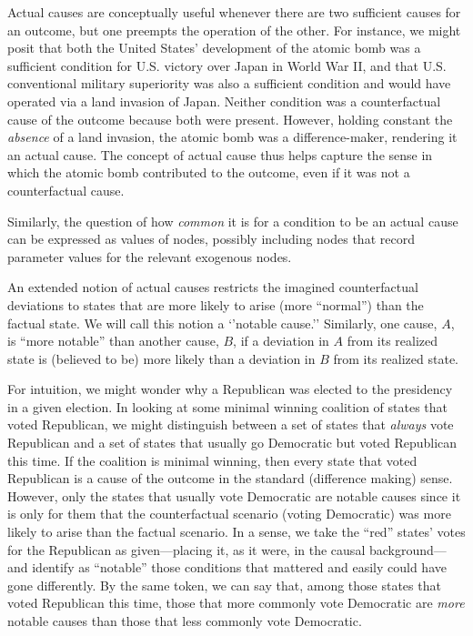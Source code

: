 \documentclass[12pt,]{book}
\begin{document}
Actual causes are conceptually useful whenever there are two sufficient causes for an outcome, but one preempts the operation of the other. For instance, we might posit that both the United States' development of the atomic bomb was a sufficient condition for U.S. victory over Japan in World War II, and that U.S. conventional military superiority was also a sufficient condition and would have operated via a land invasion of Japan. Neither condition was a counterfactual cause of the outcome because both were present. However, holding constant the \emph{absence} of a land invasion, the atomic bomb was a difference-maker, rendering it an actual cause. The concept of actual cause thus helps capture the sense in which the atomic bomb contributed to the outcome, even if it was not a counterfactual cause.

Similarly, the question of how \emph{common} it is for a condition to be an actual cause can be expressed as values of nodes, possibly including nodes that record parameter values for the relevant exogenous nodes.

An extended notion \citep[p 81]{halpern2016actual} of actual causes restricts the imagined counterfactual deviations to states that are more likely to arise (more ``normal'') than the factual state. We will call this notion a `'notable cause.'' Similarly, one cause, \(A\), is ``more notable'' than another cause, \(B\), if a deviation in \(A\) from its realized state is (believed to be) more likely than a deviation in \(B\) from its realized state.

For intuition, we might wonder why a Republican was elected to the presidency in a given election. In looking at some minimal winning coalition of states that voted Republican, we might distinguish between a set of states that \emph{always} vote Republican and a set of states that usually go Democratic but voted Republican this time. If the coalition is minimal winning, then every state that voted Republican is a cause of the outcome in the standard (difference making) sense. However, only the states that usually vote Democratic are notable causes since it is only for them that the counterfactual scenario (voting Democratic) was more likely to arise than the factual scenario. In a sense, we take the ``red'' states' votes for the Republican as given---placing it, as it were, in the causal background---and identify as ``notable'' those conditions that mattered and easily could have gone differently. By the same token, we can say that, among those states that voted Republican this time, those that more commonly vote Democratic are \emph{more} notable causes than those that less commonly vote Democratic.
\end{document}
